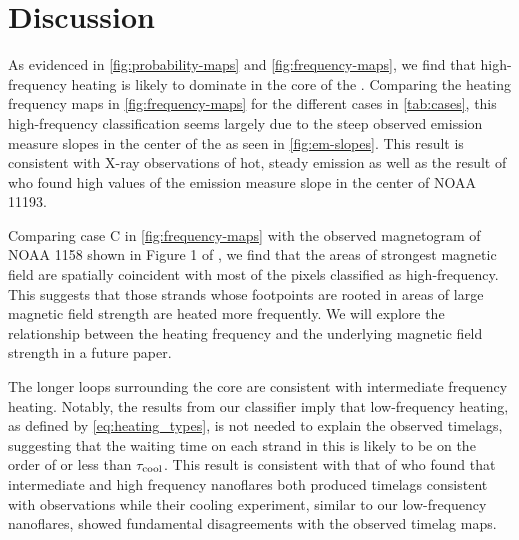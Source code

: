 \section{Discussion}\label{sec:discussion}

As evidenced in \autoref{fig:probability-maps} and \autoref{fig:frequency-maps}, we find that high-frequency heating is likely to dominate in the core of the \AR. Comparing the heating frequency maps in \autoref{fig:frequency-maps} for the different cases in \autoref{tab:cases}, this high-frequency classification seems largely due to the steep observed emission measure slopes in the center of the \AR{} as seen in \autoref{fig:em-slopes}. This result is consistent with X-ray observations of hot, steady emission \citep{warren_evidence_2010,warren_constraints_2011,winebarger_using_2011} as well as the result of \citet{del_zanna_evolution_2015} who found high values of the emission measure slope in the center of NOAA 11193.

Comparing case C in \autoref{fig:frequency-maps} with the observed magnetogram of NOAA 1158 shown in Figure 1 of , we find that the areas of strongest magnetic field are spatially coincident with most of the pixels classified as high-frequency. This suggests that those strands whose footpoints are rooted in areas of large magnetic field strength are heated more frequently. We will explore the relationship between the heating frequency and the underlying magnetic field strength in a future paper.

The longer loops surrounding the core are consistent with intermediate frequency heating. Notably, the results from our classifier imply that low-frequency heating, as defined by \autoref{eq:heating_types}, is not needed to explain the observed timelags, suggesting that the waiting time on each strand in this \AR{} is likely to be on the order of or less than $\tau_\textup{cool}$. This result is consistent with that of \citet{bradshaw_patterns_2016} who found that intermediate and high frequency nanoflares both produced timelags consistent with observations while their cooling experiment, similar to our low-frequency nanoflares, showed fundamental disagreements with the observed timelag maps.

